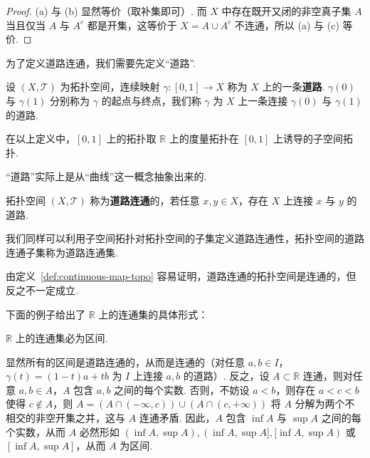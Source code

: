 \documentclass[../main.tex]{subfiles}
\begin{document}
\begin{proof}
    (a) 与 (b) 显然等价（取补集即可）. 而 $X$ 中存在既开又闭的非空真子集 $A$ 当且仅当 $A$ 与 $A^c$ 都是开集，这等价于 $X = A \cup A^c$ 不连通，所以 (a) 与 (c) 等价. 
\end{proof}

为了定义道路连通，我们需要先定义“道路”. 

\begin{definition}[道路的定义]
    设 $(X, \mathcal{T})$ 为拓扑空间，连续映射 $\gamma:[0, 1] \to X$ 称为 $X$ 上的一条\textbf{道路}. $\gamma(0)$ 与 $\gamma(1)$ 分别称为 $\gamma$ 的起点与终点，我们称 $\gamma$ 为 $X$ 上一条连接 $\gamma(0)$ 与 $\gamma(1)$ 的道路. 
\end{definition}

\begin{remark}
    在以上定义中，$[0, 1]$ 上的拓扑取 $\mathbb R$ 上的度量拓扑在 $[0, 1]$ 上诱导的子空间拓扑. 

    “道路”实际上是从“曲线”这一概念抽象出来的. 
\end{remark}

\begin{definition}[道路连通的定义] \label{def:path-connected}
    拓扑空间 $(X, \mathcal{T})$ 称为\textbf{道路连通}的，若任意 $x, y \in X$，存在 $X$ 上连接 $x$ 与 $y$ 的道路. 
\end{definition}

\begin{remark}
    我们同样可以利用子空间拓扑对拓扑空间的子集定义道路连通性，拓扑空间的道路连通子集称为道路连通集. 
\end{remark}

由定义~\ref{def:continuous-map-topo} 容易证明，道路连通的拓扑空间是连通的，但反之不一定成立. 

下面的例子给出了 $\mathbb R$ 上的连通集的具体形式：

\begin{example} \label{ex:connected-set-R}
    $\mathbb R$ 上的连通集必为区间. 
    
    显然所有的区间是道路连通的，从而是连通的（对任意 $a, b \in I$，$\gamma(t) = (1 - t)a + tb$ 为 $I$ 上连接 $a, b$ 的道路）. 反之，设 $A \subset \mathbb R$ 连通，则对任意 $a, b \in A$，$A$ 包含 $a, b$ 之间的每个实数. 否则，不妨设 $a < b$，则存在 $a < c < b$ 使得 $c \notin A$，则 $A = (A \cap (-\infty, c)) \cup (A \cap (c, +\infty))$ 将 $A$ 分解为两个不相交的非空开集之并，这与 $A$ 连通矛盾. 因此，$A$ 包含 $\inf A$ 与 $\sup A$ 之间的每个实数，从而 $A$ 必然形如 $(\inf A, \sup A), (\inf A, \sup A], [\inf A, \sup A)$ 或 $[\inf A, \sup A]$，从而 $A$ 为区间. 
\end{example}
\end{document}
